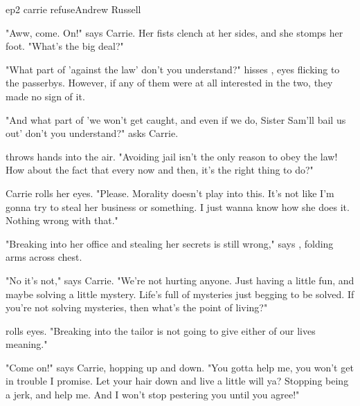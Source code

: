 \documentclass{book}
\begin{document}
\begin{childnode}{ep2 carrie refuse}{Andrew Russell}

    "Aww, come. On!" says Carrie. Her fists clench at her sides, and she stomps her foot. "What's the big deal?"

    "What part of 'against the law' don't you understand?" hisses \name{}, \hisher{} eyes flicking to the passerbys. However, if any of them were at all interested in the two, they made no sign of
    it.

    "And what part of 'we won't get caught, and even if we do, Sister Sam'll bail us out' don't you understand?" asks Carrie. 

    \name{} throws \hisher{} hands into the air. "Avoiding jail isn't the only reason to obey the law! How about the fact that every now and then, it's the right thing to do?"

    Carrie rolls her eyes. "Please. Morality doesn't play into this. It's not like I'm gonna try to steal her business or something. I just wanna know how she does it. Nothing wrong with that."

    "Breaking into her office and stealing her secrets is still wrong," says \name{}, folding \hisher{} arms across \hisher{} chest.

    "No it's not," says Carrie. "We're not hurting anyone. Just having a little fun, and maybe solving a little mystery. Life's full of mysteries just begging to be solved. If you're not solving
    mysteries, then what's the point of living?"

    \name{} rolls \hisher{} eyes. "Breaking into the tailor is not going to give either of our lives meaning."



    "Come on!" says Carrie, hopping up and down. "You gotta help me, you won't get in trouble I promise. Let your hair down and live a little will ya? Stopping being a jerk, and help me. And I won't
    stop pestering you until you agree!"





\end{childnode}
\end{document}

